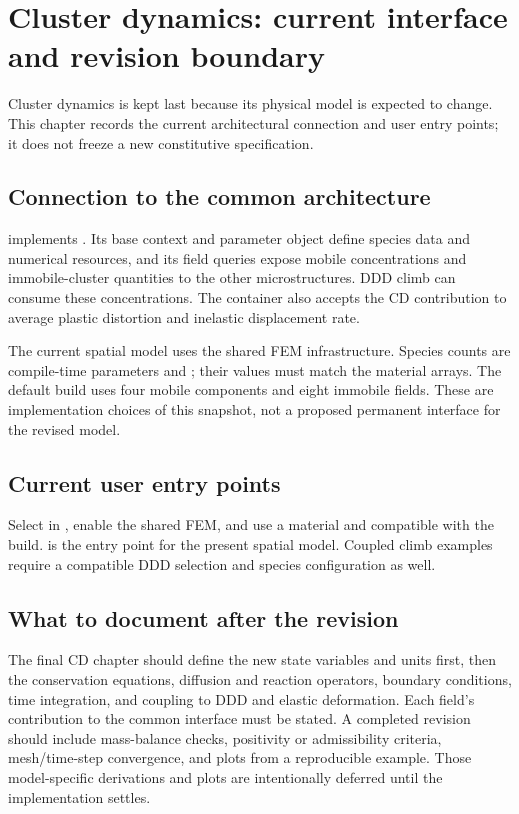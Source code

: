 \chapter{Cluster dynamics: current interface and revision boundary}\label{chap:cd}
Cluster dynamics is kept last because its physical model is expected to change. This chapter records the current architectural connection and user entry points; it does not freeze a new constitutive specification.

\section{Connection to the common architecture}
 implements . Its base context and parameter object define species data and numerical resources, and its field queries expose mobile concentrations and immobile-cluster quantities to the other microstructures. DDD climb can consume these concentrations. The container also accepts the CD contribution to average plastic distortion and inelastic displacement rate.

The current spatial model uses the shared FEM infrastructure. Species counts are compile-time parameters  and ; their values must match the material arrays. The default build uses four mobile components and eight immobile fields. These are implementation choices of this snapshot, not a proposed permanent interface for the revised model.

\section{Current user entry points}
Select  in , enable the shared FEM, and use a material and  compatible with the build.  is the entry point for the present spatial model. Coupled climb examples require a compatible DDD selection and species configuration as well.

\section{What to document after the revision}
The final CD chapter should define the new state variables and units first, then the conservation equations, diffusion and reaction operators, boundary conditions, time integration, and coupling to DDD and elastic deformation. Each field's contribution to the common interface must be stated. A completed revision should include mass-balance checks, positivity or admissibility criteria, mesh/time-step convergence, and plots from a reproducible example. Those model-specific derivations and plots are intentionally deferred until the implementation settles.

